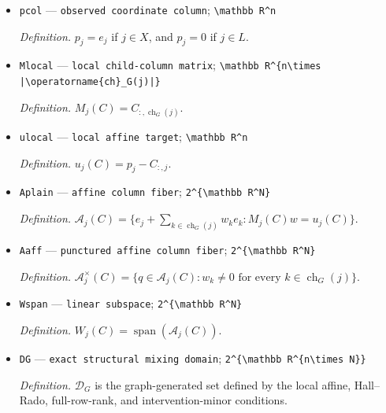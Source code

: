 \documentclass{article}
\begin{document}
\begin{itemize}
  \par\smallskip\noindent\emph{Definition.} \(\operatorname{ch}_G(j)=\{k\in V:j\to k\text{ in }G\}\).
  \item \texttt{pcol} --- \texttt{observed coordinate column}; \texttt{\textbackslash{}\allowbreak{}mathbb R\textasciicircum{}n}
  \par\smallskip\noindent\emph{Definition.} \(p_j=e_j\) if \(j\in X\), and \(p_j=0\) if \(j\in L\).
  \item \texttt{Mlocal} --- \texttt{local child-\allowbreak{}column matrix}; \texttt{\textbackslash{}\allowbreak{}mathbb R\textasciicircum{}\{n\textbackslash{}\allowbreak{}times |\textbackslash{}\allowbreak{}operatorname\{ch\}\allowbreak{}\_\allowbreak{}G(j)|\}\allowbreak{}}
  \par\smallskip\noindent\emph{Definition.} \(M_j(C)=C_{:,\operatorname{ch}_G(j)}\).
  \item \texttt{ulocal} --- \texttt{local affine target}; \texttt{\textbackslash{}\allowbreak{}mathbb R\textasciicircum{}n}
  \par\smallskip\noindent\emph{Definition.} \(u_j(C)=p_j-C_{:,j}\).
  \item \texttt{Aplain} --- \texttt{affine column fiber}; \texttt{2\textasciicircum{}\{\textbackslash{}\allowbreak{}mathbb R\textasciicircum{}N\}\allowbreak{}}
  \par\smallskip\noindent\emph{Definition.} \(\mathcal A_j(C)=\{e_j+\sum_{k\in\operatorname{ch}_G(j)}w_ke_k:M_j(C)w=u_j(C)\}\).
  \item \texttt{Aaff} --- \texttt{punctured affine column fiber}; \texttt{2\textasciicircum{}\{\textbackslash{}\allowbreak{}mathbb R\textasciicircum{}N\}\allowbreak{}}
  \par\smallskip\noindent\emph{Definition.} \(\mathcal A_j^{\times}(C)=\{q\in\mathcal A_j(C):w_k\ne0\text{ for every }k\in\operatorname{ch}_G(j)\}\).
  \item \texttt{Wspan} --- \texttt{linear subspace}; \texttt{2\textasciicircum{}\{\textbackslash{}\allowbreak{}mathbb R\textasciicircum{}N\}\allowbreak{}}
  \par\smallskip\noindent\emph{Definition.} \(W_j(C)=\operatorname{span}(\mathcal A_j(C))\).
  \item \texttt{DG} --- \texttt{exact structural mixing domain}; \texttt{2\textasciicircum{}\{\textbackslash{}\allowbreak{}mathbb R\textasciicircum{}\{n\textbackslash{}\allowbreak{}times N\}\allowbreak{}\}\allowbreak{}}
  \par\smallskip\noindent\emph{Definition.} \(\mathcal D_G\) is the graph-generated set defined by the local affine, Hall--Rado, full-row-rank, and intervention-minor conditions.

\end{itemize}
\end{document}
